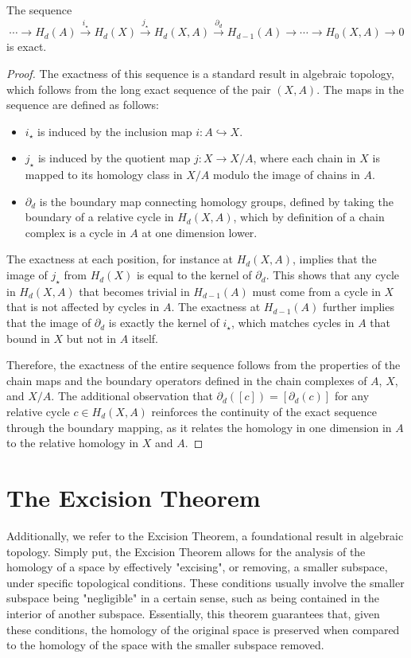 \begin{proposition}
The sequence
\begin{equation*}
\cdots \rightarrow H_d(A) \xrightarrow{i_\star} H_d(X) \xrightarrow{j_\star} H_d(X,A) \xrightarrow{\partial_d} H_{d-1}(A) \rightarrow \cdots \rightarrow H_0(X,A) \rightarrow 0
\end{equation*}
is exact.
\end{proposition}

\begin{proof}
The exactness of this sequence is a standard result in algebraic topology, which follows from the long exact sequence of the pair $(X, A)$. The maps in the sequence are defined as follows:
\begin{itemize}
    \item $i_\star$ is induced by the inclusion map $i: A \hookrightarrow X$.
    \item $j_\star$ is induced by the quotient map $j: X \rightarrow X/A$, where each chain in $X$ is mapped to its homology class in $X/A$ modulo the image of chains in $A$.
    \item $\partial_d$ is the boundary map connecting homology groups, defined by taking the boundary of a relative cycle in $H_d(X,A)$, which by definition of a chain complex is a cycle in $A$ at one dimension lower.
\end{itemize}

The exactness at each position, for instance at $H_d(X,A)$, implies that the image of $j_\star$ from $H_d(X)$ is equal to the kernel of $\partial_d$. This shows that any cycle in $H_d(X,A)$ that becomes trivial in $H_{d-1}(A)$ must come from a cycle in $X$ that is not affected by cycles in $A$. The exactness at $H_{d-1}(A)$ further implies that the image of $\partial_d$ is exactly the kernel of $i_\star$, which matches cycles in $A$ that bound in $X$ but not in $A$ itself.

Therefore, the exactness of the entire sequence follows from the properties of the chain maps and the boundary operators defined in the chain complexes of $A$, $X$, and $X/A$. The additional observation that $\partial_d([c]) = [\partial_d(c)]$ for any relative cycle $c \in H_d(X,A)$ reinforces the continuity of the exact sequence through the boundary mapping, as it relates the homology in one dimension in $A$ to the relative homology in $X$ and $A$.
\end{proof}

\section{The Excision Theorem}
Additionally, we refer to the Excision Theorem, a foundational result in algebraic topology. Simply put, the Excision Theorem allows for the analysis of the homology of a space by effectively "excising", or removing, a smaller subspace, under specific topological conditions. These conditions usually involve the smaller subspace being "negligible" in a certain sense, such as being contained in the interior of another subspace. Essentially, this theorem guarantees that, given these conditions, the homology of the original space is preserved when compared to the homology of the space with the smaller subspace removed.

